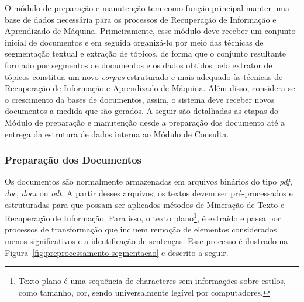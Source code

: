 O módulo de preparação e manutenção tem como função principal manter uma base de dados necessária para os processos de Recuperação de Informação e Aprendizado de Máquina. Primeiramente, esse módulo deve receber um conjunto inicial de documentos e em seguida organizá-lo por meio das técnicas de segmentação textual e extração de tópicos, de forma que o conjunto resultante formado por segmentos de documentos e os dados obtidos pelo extrator de tópicos constitua um novo \textit{corpus} estruturado e mais adequado às técnicas de Recuperação de Informação e Aprendizado de Máquina. Além disso, considera-se o crescimento da bases de documentos, assim, o sistema deve receber novos documentos a medida que são gerados. A seguir são detalhadas as etapas do Módulo de preparação e manutenção desde a preparação dos documento até a entrega da estrutura de dados interna ao Módulo de Consulta. 






\subsubsection{Preparação dos Documentos}


Os documentos são normalmente armazenadas em arquivos binários do tipo \textit{pdf}, \textit{doc}, \textit{docx} ou \textit{odt}. A partir desses arquivos, os textos devem ser pré-processados e estruturadas para que possam ser aplicados métodos de Mineração de Texto e Recuperação de Informação. Para isso, o texto plano\footnote{Texto plano é uma sequência de characteres sem informações sobre estilos, como tamanho, cor, sendo universalmente legível por computadores.}, é extraído e passa por processos de transformação que incluem remoção de elementos considerados menos significativos e a identificação de sentenças. Esse processo é ilustrado na Figura~\ref{fig:preprocessamento-segmentacao} e descrito a seguir.

